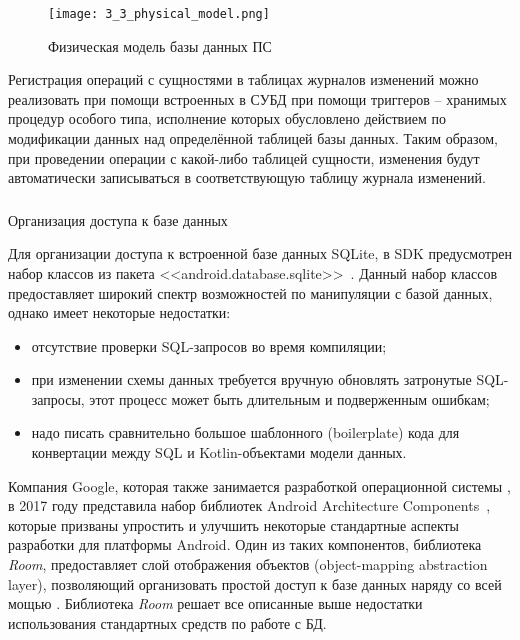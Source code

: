 \begin{figure}[ht!]
    \centering
    \texttt{[image: 3\_3\_physical\_model.png]}
    \caption{Физическая модель базы данных ПС}
    \label{fig:design:database:model:diagram}
\end{figure}

Регистрация операций с сущностями в таблицах журналов изменений можно реализовать при помощи встроенных в СУБД \sqlite при помощи триггеров -- хранимых процедур особого типа, исполнение которых обусловлено действием по модификации данных над определённой таблицей базы данных.
Таким образом, при проведении операции с какой-либо таблицей сущности, изменения будут автоматически записываться в соответствующую таблицу журнала изменений.

\subsubsection{} Организация доступа к базе данных
\label{sec:design:database:implementation}

Для организации доступа к встроенной базе данных SQLite, в \andro SDK предусмотрен набор классов из пакета <<android.database.sqlite>>~\cite{android_sqlite}.
Данный набор классов предоставляет широкий спектр возможностей по манипуляции с базой данных, однако имеет некоторые недостатки:
\begin{itemize}
    \item отсутствие проверки SQL-запросов во время компиляции;
    \item при изменении схемы данных требуется вручную обновлять затронутые SQL-запросы, этот процесс может быть длительным и подверженным ошибкам;
    \item надо писать сравнительно большое шаблонного (boilerplate) кода для конвертации между SQL и Kotlin-объектами модели данных.
\end{itemize}

Компания Google, которая также занимается разработкой операционной системы \andro, в 2017 году представила набор библиотек Android Architecture Com\-po\-nents~\cite{android_components}, которые призваны упростить и улучшить некоторые стандартные аспекты разработки для платформы Android.
Один из таких компонентов, библиотека \emph{Room}, предоставляет слой отображения  объектов (object-mapping abstraction layer), позволяющий организовать простой доступ к базе данных наряду со всей мощью \sqlite.
Библиотека \emph{Room} решает все описанные выше недостатки использования стандартных средств по работе с БД.

